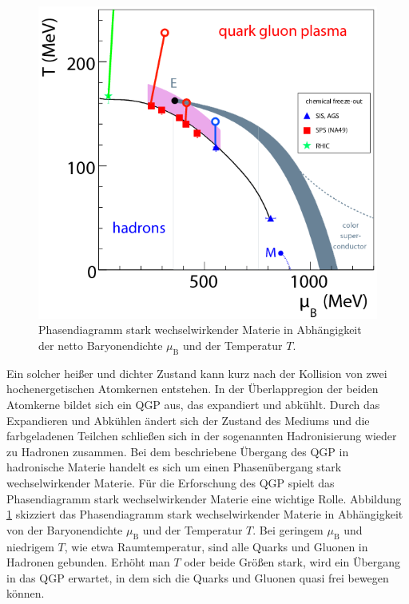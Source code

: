 \begin{figure}[tp]
\centering
\includegraphics[width=.6\linewidth]{Phasediagram_Points-2008-neu.png}
\caption{Phasendiagramm stark wechselwirkender Materie in Abh\"angigkeit der netto Baryonendichte $\mu_{\text{B}}$ und der Temperatur $T$.
\cite{PAPER:Phasediagaram}}
\label{fig:QGPPhase}
\end{figure}
\newline
Ein solcher hei{\ss}er und dichter Zustand kann kurz nach der Kollision von zwei hochenergetischen Atomkernen entstehen.
In der \"Uberlappregion der beiden Atomkerne bildet sich ein QGP aus, das expandiert und abk\"uhlt.
Durch das Expandieren und Abk\"uhlen \"andert sich der Zustand des Mediums und die farbgeladenen Teilchen schlie{\ss}en sich in der sogenannten Hadronisierung wieder zu Hadronen zusammen.
Bei dem beschriebene \"Ubergang des QGP in hadronische Materie handelt es sich um einen Phasen\"ubergang stark wechselwirkender Materie.
\newline
F\"ur die Erforschung des QGP spielt das Phasendiagramm stark wechselwirkender Materie eine wichtige Rolle.
Abbildung \ref{fig:QGPPhase} skizziert das Phasendiagramm stark wechselwirkender Materie in Abh\"angigkeit von der Baryonendichte $\mu_{\text{B}}$ und der Temperatur $T$.
Bei geringem $\mu_{\text{B}}$ und niedrigem $T$, wie etwa Raumtemperatur, sind alle Quarks und Gluonen in Hadronen gebunden.
Erh\"oht man $T$ oder beide Gr\"o{\ss}en stark, wird ein \"Ubergang in das QGP erwartet, in dem sich die Quarks und Gluonen quasi frei bewegen k\"onnen.
